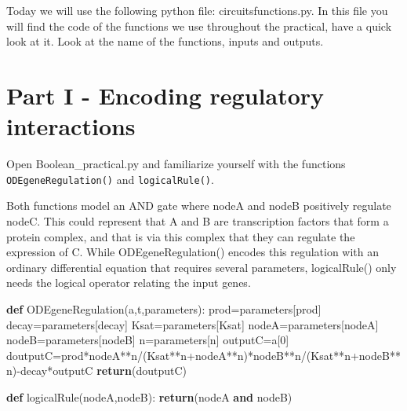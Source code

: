 \documentclass[
  letterpaper,
  DIV=11,
  numbers=noendperiod]{scrreprt}
\newenvironment{Shaded}{\begin{snugshade}}{\end{snugshade}}
\newcommand{\ControlFlowTok}[1]{\textcolor[rgb]{0.00,0.23,0.31}{\textbf{#1}}}
\newcommand{\DecValTok}[1]{\textcolor[rgb]{0.68,0.00,0.00}{#1}}
\newcommand{\KeywordTok}[1]{\textcolor[rgb]{0.00,0.23,0.31}{\textbf{#1}}}
\newcommand{\NormalTok}[1]{\textcolor[rgb]{0.00,0.23,0.31}{#1}}
\newcommand{\OperatorTok}[1]{\textcolor[rgb]{0.37,0.37,0.37}{#1}}
\newcommand{\StringTok}[1]{\textcolor[rgb]{0.13,0.47,0.30}{#1}}
\theoremstyle{definition}
\theoremstyle{remark}
\begin{document}
Today we will use the following python file: circuitsfunctions.py. In
this file you will find the code of the functions we use throughout the
practical, have a quick look at it. Look at the name of the functions,
inputs and outputs.

\section{Part I - Encoding regulatory
interactions}\label{part-i---encoding-regulatory-interactions}

Open Boolean\_practical.py and familiarize yourself with the functions
\texttt{ODEgeneRegulation()} and \texttt{logicalRule()}.

Both functions model an AND gate where nodeA and nodeB positively
regulate nodeC. This could represent that A and B are transcription
factors that form a protein complex, and that is via this complex that
they can regulate the expression of C. While ODEgeneRegulation() encodes
this regulation with an ordinary differential equation that requires
several parameters, logicalRule() only needs the logical operator
relating the input genes.

\begin{Shaded}
\begin{Highlighting}[]
\KeywordTok{def}\NormalTok{ ODEgeneRegulation(a,t,parameters): }
\NormalTok{    prod}\OperatorTok{=}\NormalTok{parameters[}\StringTok{\textquotesingle{}prod\textquotesingle{}}\NormalTok{]}
\NormalTok{    decay}\OperatorTok{=}\NormalTok{parameters[}\StringTok{\textquotesingle{}decay\textquotesingle{}}\NormalTok{]}
\NormalTok{    Ksat}\OperatorTok{=}\NormalTok{parameters[}\StringTok{\textquotesingle{}Ksat\textquotesingle{}}\NormalTok{]}
\NormalTok{    nodeA}\OperatorTok{=}\NormalTok{parameters[}\StringTok{\textquotesingle{}nodeA\textquotesingle{}}\NormalTok{]}
\NormalTok{    nodeB}\OperatorTok{=}\NormalTok{parameters[}\StringTok{\textquotesingle{}nodeB\textquotesingle{}}\NormalTok{]}
\NormalTok{    n}\OperatorTok{=}\NormalTok{parameters[}\StringTok{\textquotesingle{}n\textquotesingle{}}\NormalTok{]}
\NormalTok{    outputC}\OperatorTok{=}\NormalTok{a[}\DecValTok{0}\NormalTok{]}
\NormalTok{    doutputC}\OperatorTok{=}\NormalTok{prod}\OperatorTok{*}\NormalTok{nodeA}\OperatorTok{**}\NormalTok{n}\OperatorTok{/}\NormalTok{(Ksat}\OperatorTok{**}\NormalTok{n}\OperatorTok{+}\NormalTok{nodeA}\OperatorTok{**}\NormalTok{n)}\OperatorTok{*}\NormalTok{nodeB}\OperatorTok{**}\NormalTok{n}\OperatorTok{/}\NormalTok{(Ksat}\OperatorTok{**}\NormalTok{n}\OperatorTok{+}\NormalTok{nodeB}\OperatorTok{**}\NormalTok{n)}\OperatorTok{{-}}\NormalTok{decay}\OperatorTok{*}\NormalTok{outputC  }
    \ControlFlowTok{return}\NormalTok{(doutputC)}

\KeywordTok{def}\NormalTok{ logicalRule(nodeA,nodeB):}
    \ControlFlowTok{return}\NormalTok{(nodeA }\KeywordTok{and}\NormalTok{ nodeB)}
\end{Highlighting}
\end{Shaded}
\end{document}
